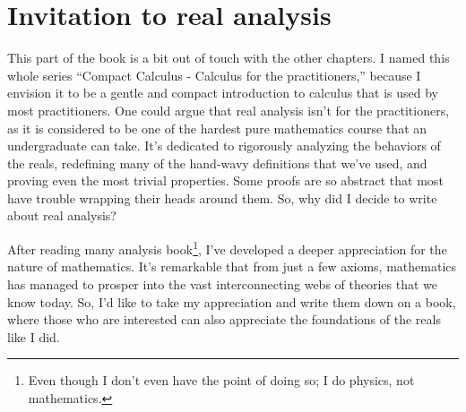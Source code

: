 \chapter{Invitation to real analysis}

This part of the book is a bit out of touch with the other chapters. I named this whole series \enquote{Compact Calculus - Calculus for the practitioners,} because I envision it to be a gentle and compact introduction to calculus that is used by most practitioners. One could argue that real analysis isn't for the practitioners, as it is considered to be one of the hardest pure mathematics course that an undergraduate can take. It's dedicated to rigorously analyzing the behaviors of the reals, redefining many of the hand-wavy definitions that we've used, and proving even the most trivial properties. Some proofs are so abstract that most have trouble wrapping their heads around them. So, why did I decide to write about real analysis?

After reading many analysis book\footnote{Even though I don't even have the point of doing so; I do physics, not mathematics.}, I've developed a deeper appreciation for the nature of mathematics. It's remarkable that from just a few axioms, mathematics has managed to prosper into the vast interconnecting webs of theories that we know today. So, I'd like to take my appreciation and write them down on a book, where those who are interested can also appreciate the foundations of the reals like I did.

